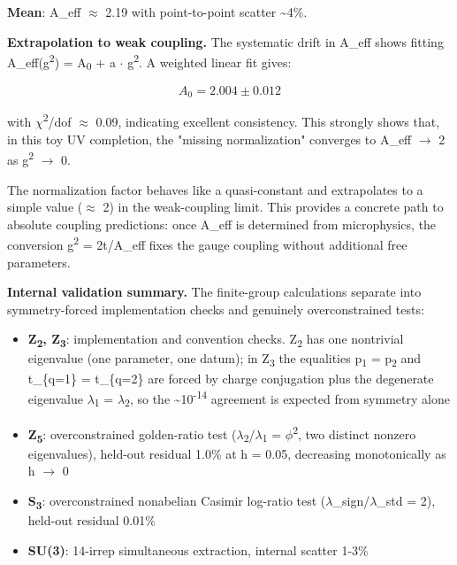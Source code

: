 \textbf{Mean}: A\_eff \ensuremath{\approx} 2.19 with point-to-point scatter \textasciitilde4\%.

\textbf{Extrapolation to weak coupling.} The systematic drift in A\_eff shows fitting A\_eff(g\textsuperscript{2}) = A\textsubscript{0} + a \ensuremath{\cdot} g\textsuperscript{2}. A weighted linear fit gives:

\[
A_0 = 2.004 \pm 0.012
\]

with \ensuremath{\chi}\textsuperscript{2}/dof \ensuremath{\approx} 0.09, indicating excellent consistency. This strongly shows that, in this toy UV completion, the "missing normalization" converges to A\_eff \ensuremath{\to} 2 as g\textsuperscript{2} \ensuremath{\to} 0.

The normalization factor behaves like a quasi-constant and extrapolates to a simple value (\ensuremath{\approx} 2) in the weak-coupling limit. This provides a concrete path to absolute coupling predictions: once A\_eff is determined from microphysics, the conversion g\textsuperscript{2} = 2t/A\_eff fixes the gauge coupling without additional free parameters.

\textbf{Internal validation summary.} The finite-group calculations separate into symmetry-forced implementation checks and genuinely overconstrained tests:

\begin{itemize}
\tightlist
\item
  \textbf{Z\textsubscript{2}, Z\textsubscript{3}}: implementation and convention checks. Z\textsubscript{2} has one nontrivial eigenvalue (one parameter, one datum); in Z\textsubscript{3} the equalities p\textsubscript{1} = p\textsubscript{2} and t\_\{q=1\} = t\_\{q=2\} are forced by charge conjugation plus the degenerate eigenvalue \ensuremath{\lambda}\textsubscript{1} = \ensuremath{\lambda}\textsubscript{2}, so the \textasciitilde10\textsuperscript{-}\textsuperscript{1}\textsuperscript{4} agreement is expected from symmetry alone
\item
  \textbf{Z\textsubscript{5}}: overconstrained golden-ratio test (\ensuremath{\lambda}\textsubscript{2}/\ensuremath{\lambda}\textsubscript{1} = \ensuremath{\phi}\textsuperscript{2}, two distinct nonzero eigenvalues), held-out residual 1.0\% at h = 0.05, decreasing monotonically as h \ensuremath{\to} 0
\item
  \textbf{S\textsubscript{3}}: overconstrained nonabelian Casimir log-ratio test (\ensuremath{\lambda}\_sign/\ensuremath{\lambda}\_std = 2), held-out residual 0.01\%
\item
  \textbf{SU(3)}: 14-irrep simultaneous extraction, internal scatter 1-3\%
\end{itemize}


